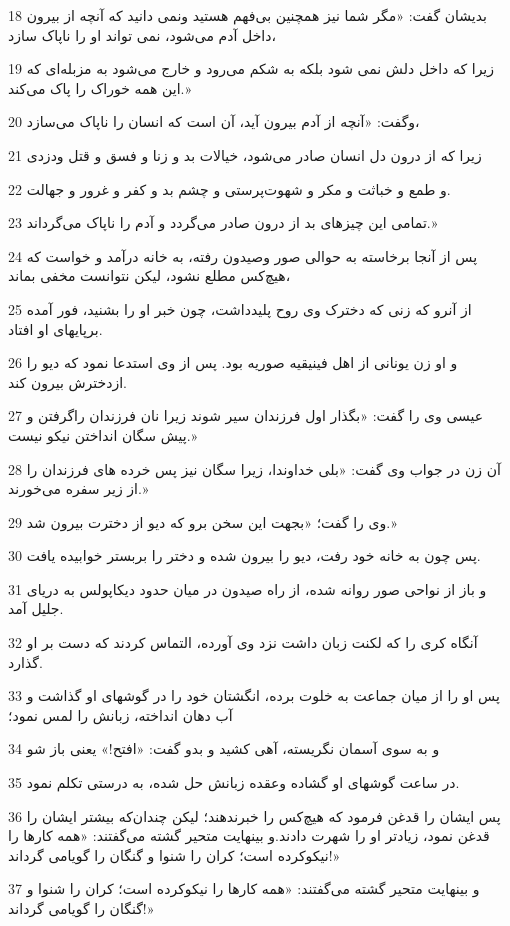 \par 18 بدیشان گفت: «مگر شما نیز همچنین بی‌فهم هستید ونمی دانید که آنچه از بیرون داخل آدم می‌شود، نمی تواند او را ناپاک سازد،
\par 19 زیرا که داخل دلش نمی شود بلکه به شکم می‌رود و خارج می‌شود به مزبله‌ای که این همه خوراک را پاک می‌کند.»
\par 20 وگفت: «آنچه از آدم بیرون آید، آن است که انسان را ناپاک می‌سازد،
\par 21 زیرا که از درون دل انسان صادر می‌شود، خیالات بد و زنا و فسق و قتل ودزدی
\par 22 و طمع و خباثت و مکر و شهوت‌پرستی و چشم بد و کفر و غرور و جهالت.
\par 23 تمامی این چیزهای بد از درون صادر می‌گردد و آدم را ناپاک می‌گرداند.»
\par 24 پس از آنجا برخاسته به حوالی صور وصیدون رفته، به خانه درآمد و خواست که هیچ‌کس مطلع نشود، لیکن نتوانست مخفی بماند،
\par 25 از آنرو که زنی که دخترک وی روح پلیدداشت، چون خبر او را بشنید، فور آمده برپایهای او افتاد.
\par 26 و او زن یونانی از اهل فینیقیه صوریه بود. پس از وی استدعا نمود که دیو را ازدخترش بیرون کند.
\par 27 عیسی وی را گفت: «بگذار اول فرزندان سیر شوند زیرا نان فرزندان راگرفتن و پیش سگان انداختن نیکو نیست.»
\par 28 آن زن در جواب وی گفت: «بلی خداوندا، زیرا سگان نیز پس خرده های فرزندان را از زیر سفره می‌خورند.»
\par 29 وی را گفت؛ «بجهت این سخن برو که دیو از دخترت بیرون شد.»
\par 30 پس چون به خانه خود رفت، دیو را بیرون شده و دختر را بربستر خوابیده یافت.
\par 31 و باز از نواحی صور روانه شده، از راه صیدون در میان حدود دیکاپولس به دریای جلیل آمد.
\par 32 آنگاه کری را که لکنت زبان داشت نزد وی آورده، التماس کردند که دست بر او گذارد.
\par 33 پس او را از میان جماعت به خلوت برده، انگشتان خود را در گوشهای او گذاشت و آب دهان انداخته، زبانش را لمس نمود؛
\par 34 و به سوی آسمان نگریسته، آهی کشید و بدو گفت: «افتح!» یعنی باز شو
\par 35 در ساعت گوشهای او گشاده وعقده زبانش حل شده، به درستی تکلم نمود.
\par 36 پس ایشان را قدغن فرمود که هیچ‌کس را خبرندهند؛ لیکن چندان‌که بیشتر ایشان را قدغن نمود، زیادتر او را شهرت دادند.و بینهایت متحیر گشته می‌گفتند: «همه کارها را نیکوکرده است؛ کران را شنوا و گنگان را گویامی گرداند!»
\par 37 و بینهایت متحیر گشته می‌گفتند: «همه کارها را نیکوکرده است؛ کران را شنوا و گنگان را گویامی گرداند!»

